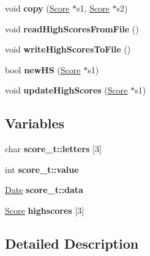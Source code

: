 \begin{DoxyCompactItemize}
\mbox{\label{group__Score_ga823c62189ee19b48fb4060583d45d930}} 
void {\bfseries copy} (\hyperlink{structscore__t}{Score} $\ast$s1, \hyperlink{structscore__t}{Score} $\ast$s2)
\item 
\mbox{\label{group__Score_ga20f0db32afdef331f13aa08352c08032}} 
void {\bfseries read\+High\+Scores\+From\+File} ()
\item 
\mbox{\label{group__Score_ga9128af8635cc20dec46e0847463b4391}} 
void {\bfseries write\+High\+Scores\+To\+File} ()
\item 
\mbox{\label{group__Score_gab43c50a8ba79f74e26dc5041c5303084}} 
bool {\bfseries new\+HS} (\hyperlink{structscore__t}{Score} $\ast$s1)
\item 
\mbox{\label{group__Score_ga7af3cccf5d7303b780e8a36d67d0cb09}} 
void {\bfseries update\+High\+Scores} (\hyperlink{structscore__t}{Score} $\ast$s1)
\end{DoxyCompactItemize}
\subsection*{Variables}
\begin{DoxyCompactItemize}
\item 
\mbox{\label{group__Score_ga6e1b5494e7c9f0d1472e1cd822454213}} 
char {\bfseries score\+\_\+t\+::letters} \mbox{[}3\mbox{]}
\item 
\mbox{\label{group__Score_ga2a820a1f5d9b464a6ec91125bdaa082e}} 
int {\bfseries score\+\_\+t\+::value}
\item 
\mbox{\label{group__Score_ga3f722bdee4dfd1618c624d011cd00bd8}} 
\hyperlink{structdate}{Date} {\bfseries score\+\_\+t\+::data}
\item 
\mbox{\label{group__Score_ga714329844318cac68c44922dbd0b1e4f}} 
\hyperlink{structscore__t}{Score} {\bfseries highscores} \mbox{[}3\mbox{]}
\end{DoxyCompactItemize}


\subsection{Detailed Description}
